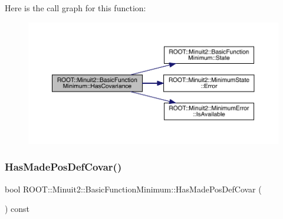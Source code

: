 Here is the call graph for this function\+:
\nopagebreak
\begin{figure}[H]
\begin{center}
\leavevmode
\includegraphics[width=350pt]{de/d25/classROOT_1_1Minuit2_1_1BasicFunctionMinimum_ac876224368add09ceab711d3515fd959_cgraph}
\end{center}
\end{figure}
\mbox{\label{classROOT_1_1Minuit2_1_1BasicFunctionMinimum_a57562fcd9f78a8e4f9a425c8f80f1d83}} 
\subsubsection{\texorpdfstring{HasMadePosDefCovar()}{HasMadePosDefCovar()}\hspace{0.1cm}{\footnotesize\ttfamily [1/2]}}
{\footnotesize\ttfamily bool R\+O\+O\+T\+::\+Minuit2\+::\+Basic\+Function\+Minimum\+::\+Has\+Made\+Pos\+Def\+Covar (\begin{DoxyParamCaption}{ }\end{DoxyParamCaption}) const\hspace{0.3cm}{\ttfamily [inline]}}

